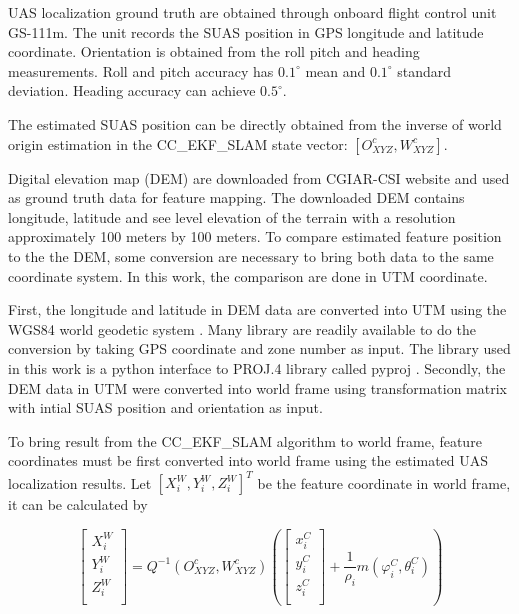 UAS localization ground truth are obtained through onboard flight
control unit GS-111m. The unit records the SUAS position in GPS
longitude and latitude coordinate. Orientation is obtained from the
roll pitch and heading measurements. Roll and pitch accuracy has
$0.1^\circ$ mean and $0.1^\circ$ standard deviation. Heading accuracy can
achieve $0.5^\circ$.\cite{_athena_????}

The estimated SUAS position can be directly obtained from the inverse
of world origin estimation in the CC\_EKF\_SLAM state vector:
$[O_{XYZ}^{c}, W_{XYZ}^{c}]$.

Digital elevation map (DEM) are downloaded from CGIAR-CSI website
\cite{_cgiar-csi_????} and used as ground truth data for feature
mapping. The downloaded DEM contains longitude, latitude and see level
elevation of the terrain with a resolution approximately 100 meters by
100 meters. To compare estimated feature position to the the DEM, some
conversion are necessary to bring both data to the same coordinate
system. In this work, the comparison are done in UTM coordinate. 

First, the longitude and latitude in DEM data are converted into UTM
using the WGS84 world geodetic system \cite{_world_????}. Many library
are readily available to do the conversion by taking GPS coordinate
and zone number as input. The library used in this work is a python
interface to PROJ.4 library \cite{_pyproj_????} called pyproj
\cite{_pyproj_????}. Secondly, the DEM data in UTM were converted into
world frame using transformation matrix with intial SUAS position and
orientation as input.

To bring result from the CC\_EKF\_SLAM algorithm to world frame, feature
coordinates must be first converted into world frame using the
estimated UAS localization results. Let $[X_i^W,Y_i^W, Z_i^W]^T$ be
the feature coordinate in world frame, it can be calculated by

\begin{equation}
  \left[ \begin{array}{c}
    X_{i}^{W}  \\
    Y_{i}^{W}  \\
    Z_{i}^{W}  \\
  \end{array} \right]=Q^{-1}(O_{XYZ}^{c}, W_{XYZ}^{c})\left(\left[
    \begin{array}{c}
      x_{i}^{C} \\
      y_{i}^{C} \\
      z_{i}^{C} \\
    \end{array}
  \right]+\frac{1}{\rho _{i}}m(\varphi _{i}^{C},\theta_{i}^{C})\right)
\end{equation}

